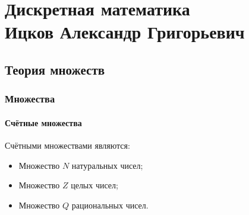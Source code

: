\part[Дискретная математика]{
Дискретная математика \\
{\Large Ицков Александр Григорьевич}
}

\chapter{Теория множеств}

\section{Множества}

\subsection{Счётные множества}

Счётными множествами являются:
\begin{itemize}
	\item Множество $N$ натуральных чисел;
	\item Множество $Z$ целых чисел;
	\item Множество $Q$ рациональных чисел.
\end{itemize}

